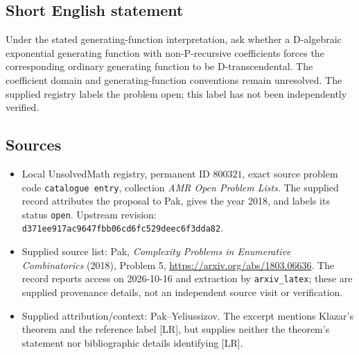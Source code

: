 \documentclass[11pt]{article}
\begin{document}
\subsection{Short English statement}
Under the stated generating-function interpretation, ask whether a D-algebraic exponential generating function with non-P-recursive coefficients forces the corresponding ordinary generating function to be D-transcendental. The coefficient domain and generating-function conventions remain unresolved. The supplied registry labels the problem open; this label has not been independently verified.
\subsection{Sources}
\begin{itemize}
\item Local UnsolvedMath registry, permanent ID \(800321\), exact source problem code \texttt{catalogue entry}, collection \emph{AMR Open Problem Lists}. The supplied record attributes the proposal to Pak, gives the year 2018, and labels its status \texttt{open}. Upstream revision: \texttt{d371ee917ac9647fbb06cd6fc529deec6f3dda82}.
\item Supplied source list: Pak, \emph{Complexity Problems in Enumerative Combinatorics} (2018), Problem 5, \url{https://arxiv.org/abs/1803.06636}. The record reports access on 2026-10-16 and extraction by \texttt{arxiv\_latex}; these are supplied provenance details, not an independent source visit or verification.
\item Supplied attribution/context: Pak--Yeliussizov. The excerpt mentions Klazar's theorem and the reference label [LR], but supplies neither the theorem's statement nor bibliographic details identifying [LR].
\end{itemize}
\end{document}
